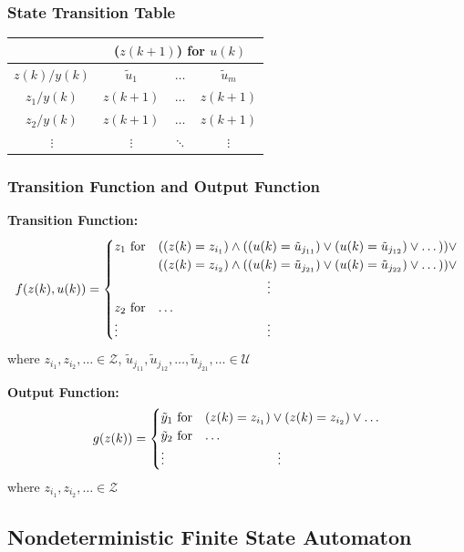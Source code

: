\documentclass[10pt,a4paper]{article}
\newcommand{\tab}[1][1]{\hspace*{#1cm}}
\begin{document}
\subsubsection{State Transition Table}
\begin{tabular}{cccc}
	\hline
	& \multicolumn{3}{c}{($z(k + 1)$) for $u(k)$} \\
	\hline
	$z(k)/y(k)$ & $\tilde u_1$ & $\dots$ & $\tilde u_m$ \\
	\hline
	$z_1/y(k)$ & $z(k + 1)$ & $\dots$ & $z(k + 1)$ \\
	$z_2/y(k)$ & $z(k + 1)$ & $\dots$ & $z(k + 1)$ \\
	$\vdots$ & $\vdots$ & $\ddots$ & $\vdots$ \\
	\hline
\end{tabular}

\subsubsection{Transition Function and Output Function}
\textbf{Transition Function:} ~\\
$$
	f(z(k), u(k)) = \begin{cases}
	z_1 \text{ for} & ((z(k) = z_{i_1}) \land ((u(k) = \tilde u_{j_{11}}) \lor (u(k) = \tilde u_{j_{12}}) \lor \dots)) \lor \\
	& ((z(k) = z_{i_2}) \land ((u(k) = \tilde u_{j_{21}}) \lor (u(k) = \tilde u_{j_{22}}) \lor \dots)) \lor \\
	& \tab[3] \vdots \\
	z_2 \text{ for} & \dots \\
	\vdots & \tab[3] \vdots 
	\end{cases}
$$
where $z_{i_1}, z_{i_2}, \dots \in \mathcal Z$, $\tilde u_{j_{11}}, \tilde u_{j_{12}}, \dots, \tilde u_{j_{21}}, \dots \in \mathcal U$

\textbf{Output Function:} ~\\
$$
	g(z(k)) = \begin{cases}
	\tilde y_1 \text{ for} & (z(k) = z_{i_1}) \lor (z(k) = z_{i_2}) \lor \dots \\
	\tilde y_2 \text{ for} & \dots \\
	\vdots & \tab[2] \vdots 
	\end{cases}
$$
where $z_{i_1}, z_{i_2}, \dots \in \mathcal Z$

\subsection{Nondeterministic Finite State Automaton}
\end{document}
